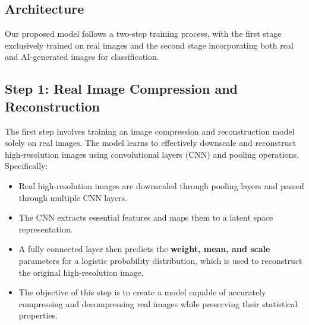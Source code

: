 \documentclass{article} %
\begin{document}
\subsection{Architecture}
\label{sec:architecture}


Our proposed model follows a two-step training process, with the first stage exclusively trained on real images and the second stage incorporating both real and AI-generated images for classification.

\subsection{Step 1: Real Image Compression and Reconstruction}
The first step involves training an image compression and reconstruction model solely on real images. The model learns to effectively downscale and reconstruct high-resolution images using convolutional layers (CNN) and pooling operations. Specifically:
\begin{itemize}
    \item Real high-resolution images are downscaled through pooling layers and passed through multiple CNN layers.
    \item The CNN extracts essential features and maps them to a latent space representation.
    \item A fully connected layer then predicts the \textbf{weight, mean, and scale} parameters for a logistic probability distribution, which is used to reconstruct the original high-resolution image.
    \item The objective of this step is to create a model capable of accurately compressing and decompressing real images while preserving their statistical properties.
\end{itemize}
\end{document}
